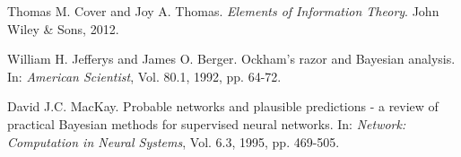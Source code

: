 \documentclass[11pt]{article}
\theoremstyle{plain} %
\theoremstyle{remark}
\begin{document}
\begin{thebibliography}{99}

  Thomas M. Cover and Joy A. Thomas.
  \newblock \emph{Elements of Information Theory}.
  \newblock John Wiley \& Sons, 2012.

  William H. Jefferys and James O. Berger.
  \newblock Ockham's razor and Bayesian analysis.
  \newblock In: \emph{American Scientist}, Vol. 80.1, 1992, pp. 64-72.

  David J.C. MacKay.
  \newblock Probable networks and plausible predictions - a review of practical Bayesian methods for supervised neural networks.
  \newblock In: \emph{Network: Computation in Neural Systems}, Vol. 6.3, 1995, pp. 469-505.

\end{thebibliography}
\end{document}
